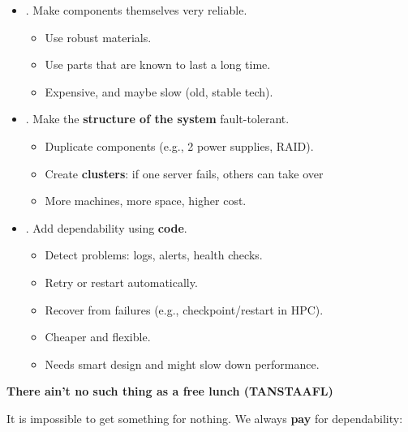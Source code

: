 \begin{itemize}
    \item {}. Make components themselves very reliable.
    \begin{itemize}[label=\textcolor{Green3}{}]
        \item Use robust materials.
        \item Use parts that are known to last a long time.
        \item[\textcolor{Red2}{\faIcon{times}}] Expensive, and maybe slow (old, stable tech).
    \end{itemize}

    \item {}. Make the \textbf{structure of the system} fault-tolerant.
    \begin{itemize}[label=\textcolor{Green3}{}]
        \item Duplicate components (e.g., 2 power supplies, RAID).
        \item Create \textbf{clusters}: if one server fails, others can take over
        \item[\textcolor{Red2}{\faIcon{times}}] More machines, more space, higher cost.
    \end{itemize}

    \item {}. Add dependability using \textbf{code}.
    \begin{itemize}[label=\textcolor{Green3}{}]
        \item Detect problems: logs, alerts, health checks.
        \item Retry or restart automatically.
        \item Recover from failures (e.g., checkpoint/restart in HPC).
        \item Cheaper and flexible.
        \item[\textcolor{Red2}{\faIcon{times}}] Needs smart design and might slow down performance.
    \end{itemize}
\end{itemize}

\highspace
\begin{flushleft}
    \textcolor{Red2}{ \textbf{There ain't no such thing as a free lunch (TANSTAAFL)}}
\end{flushleft}
It is impossible to get something for nothing. We always \textbf{pay} for dependability:

